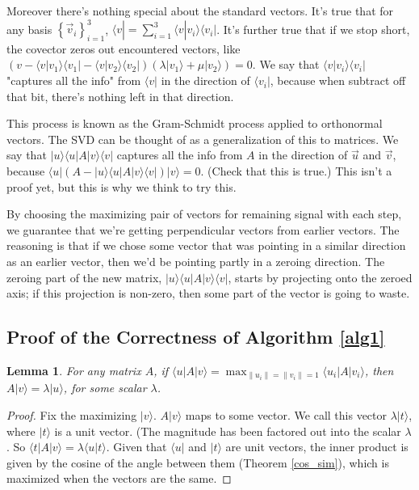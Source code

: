 \documentclass{amsbook}
\newtheorem{lemma}[theorem]{Lemma}
\begin{document}
\begin{tcolorbox}[title=Example: Covector Analogy,colback=blue!5]
Moreover there's nothing special about the standard vectors.  It's true that for any basis $\left\{\vec v _i\right\}_{i=1}^3$, $\langle v| = \sum_{i=1}^3\langle v| v _i\rangle\langle v _i|$.  It's further true that if we stop short, the covector zeros out encountered vectors, like $\left(v-\langle v| v _1\rangle\langle v _1|-\langle v| v _2\rangle\langle v _2|\right)\left(\lambda| v _1\rangle+\mu| v _2\rangle\right)=0$.  We say that $\langle v| v _i\rangle\langle v _i|$ "captures all the info" from $\langle v|$ in the direction of $\langle v _i|$, because when subtract off that bit, there's nothing left in that direction.

This process is known as the Gram-Schmidt process applied to orthonormal vectors.  The SVD can be thought of as a generalization of this to matrices.  We say that $| u \rangle\langle u |A| v \rangle\langle v |$ captures all the info from  $A$ in the direction of $\vec u $ and $\vec v $, because $\langle u |\left(A-| u \rangle\langle u |A| v \rangle\langle v |\right)| v \rangle=0$.  (Check that this is true.)  This isn't a proof yet, but this is why we think to try this.

By choosing the maximizing pair of vectors for remaining signal with each step, we guarantee that we're getting perpendicular vectors from earlier vectors.  The reasoning is that if we chose some vector that was pointing in a similar direction as an earlier vector, then we'd be pointing partly in a zeroing direction.  The zeroing part of the new matrix, $| u \rangle\langle u |A| v \rangle\langle v |$, starts by projecting onto the zeroed axis; if this projection is non-zero, then some part of the vector is going to waste.
\end{tcolorbox}

\subsection{Proof of the Correctness of Algorithm \ref{alg1}}

\begin{lemma}
\label{tollbooth}
For any matrix $A$, if $\langle u |A| v \rangle=\max_{\|u_i\|=\|v_i\|=1}\langle u_i |A| v_i \rangle$, then $A| v \rangle=\lambda| u \rangle$, for some scalar $\lambda$.
\end{lemma}

\begin{proof}
Fix the maximizing $|v\rangle$.  $A| v \rangle$ maps to some vector.  We call this vector $\lambda|t\rangle$, where $|t\rangle$ is a unit vector.  (The magnitude has been factored out into the scalar $\lambda$.  So $\langle t |A| v \rangle=\lambda\langle u | t\rangle$.  Given that $\langle u |$ and $| t\rangle$ are unit vectors, the inner product is given by the cosine of the angle between them (Theorem \ref{cos_sim}), which is maximized when the vectors are the same.
\end{proof}
\end{document}
